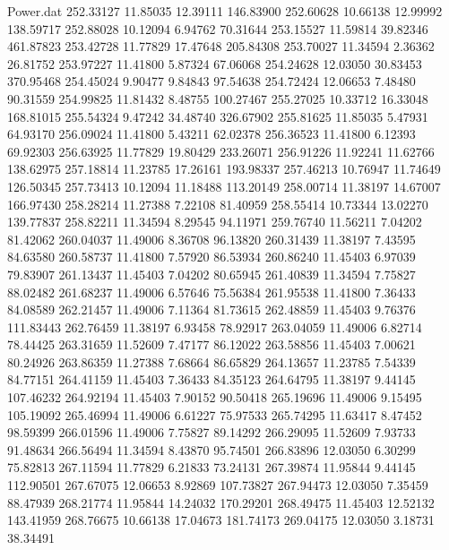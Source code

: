 \begin{filecontents}{Power.dat}
 252.33127   11.85035   12.39111  146.83900
 252.60628   10.66138   12.99992  138.59717
 252.88028   10.12094    6.94762   70.31644
 253.15527   11.59814   39.82346  461.87823
 253.42728   11.77829   17.47648  205.84308
 253.70027   11.34594    2.36362   26.81752
 253.97227   11.41800    5.87324   67.06068
 254.24628   12.03050   30.83453  370.95468
 254.45024    9.90477    9.84843   97.54638
 254.72424   12.06653    7.48480   90.31559
 254.99825   11.81432    8.48755  100.27467
 255.27025   10.33712   16.33048  168.81015
 255.54324    9.47242   34.48740  326.67902
 255.81625   11.85035    5.47931   64.93170
 256.09024   11.41800    5.43211   62.02378
 256.36523   11.41800    6.12393   69.92303
 256.63925   11.77829   19.80429  233.26071
 256.91226   11.92241   11.62766  138.62975
 257.18814   11.23785   17.26161  193.98337
 257.46213   10.76947   11.74649  126.50345
 257.73413   10.12094   11.18488  113.20149
 258.00714   11.38197   14.67007  166.97430
 258.28214   11.27388    7.22108   81.40959
 258.55414   10.73344   13.02270  139.77837
 258.82211   11.34594    8.29545   94.11971
 259.76740   11.56211    7.04202   81.42062
 260.04037   11.49006    8.36708   96.13820
 260.31439   11.38197    7.43595   84.63580
 260.58737   11.41800    7.57920   86.53934
 260.86240   11.45403    6.97039   79.83907
 261.13437   11.45403    7.04202   80.65945
 261.40839   11.34594    7.75827   88.02482
 261.68237   11.49006    6.57646   75.56384
 261.95538   11.41800    7.36433   84.08589
 262.21457   11.49006    7.11364   81.73615
 262.48859   11.45403    9.76376  111.83443
 262.76459   11.38197    6.93458   78.92917
 263.04059   11.49006    6.82714   78.44425
 263.31659   11.52609    7.47177   86.12022
 263.58856   11.45403    7.00621   80.24926
 263.86359   11.27388    7.68664   86.65829
 264.13657   11.23785    7.54339   84.77151
 264.41159   11.45403    7.36433   84.35123
 264.64795   11.38197    9.44145  107.46232
 264.92194   11.45403    7.90152   90.50418
 265.19696   11.49006    9.15495  105.19092
 265.46994   11.49006    6.61227   75.97533
 265.74295   11.63417    8.47452   98.59399
 266.01596   11.49006    7.75827   89.14292
 266.29095   11.52609    7.93733   91.48634
 266.56494   11.34594    8.43870   95.74501
 266.83896   12.03050    6.30299   75.82813
 267.11594   11.77829    6.21833   73.24131
 267.39874   11.95844    9.44145  112.90501
 267.67075   12.06653    8.92869  107.73827
 267.94473   12.03050    7.35459   88.47939
 268.21774   11.95844   14.24032  170.29201
 268.49475   11.45403   12.52132  143.41959
 268.76675   10.66138   17.04673  181.74173
 269.04175   12.03050    3.18731   38.34491

\end{filecontents}
